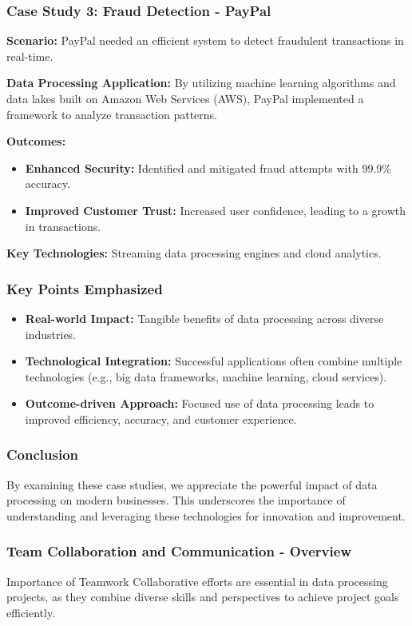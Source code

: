 \documentclass{beamer}
\begin{document}
\begin{frame}[fragile]
    \frametitle{Case Study 3: Fraud Detection - PayPal}
    \textbf{Scenario:} PayPal needed an efficient system to detect fraudulent transactions in real-time.

    \textbf{Data Processing Application:} By utilizing machine learning algorithms and data lakes built on Amazon Web Services (AWS), PayPal implemented a framework to analyze transaction patterns.

    \textbf{Outcomes:}
    \begin{itemize}
        \item \textbf{Enhanced Security:} Identified and mitigated fraud attempts with 99.9\% accuracy.
        \item \textbf{Improved Customer Trust:} Increased user confidence, leading to a growth in transactions.
    \end{itemize}

    \textbf{Key Technologies:} Streaming data processing engines and cloud analytics.
\end{frame}

\begin{frame}[fragile]
    \frametitle{Key Points Emphasized}
    \begin{itemize}
        \item \textbf{Real-world Impact:} Tangible benefits of data processing across diverse industries.
        \item \textbf{Technological Integration:} Successful applications often combine multiple technologies (e.g., big data frameworks, machine learning, cloud services).
        \item \textbf{Outcome-driven Approach:} Focused use of data processing leads to improved efficiency, accuracy, and customer experience.
    \end{itemize}
\end{frame}

\begin{frame}[fragile]
    \frametitle{Conclusion}
    By examining these case studies, we appreciate the powerful impact of data processing on modern businesses. This underscores the importance of understanding and leveraging these technologies for innovation and improvement.
\end{frame}

\begin{frame}[fragile]
    \frametitle{Team Collaboration and Communication - Overview}
    \begin{block}{Importance of Teamwork}
        Collaborative efforts are essential in data processing projects, as they combine diverse skills and perspectives to achieve project goals efficiently.
    \end{block}
\end{frame}
\end{document}
